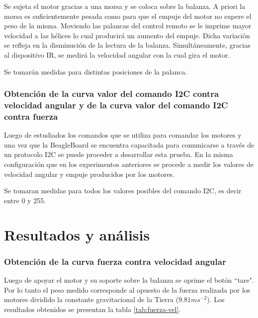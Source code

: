 \documentclass[spanish,12pt,a4paper,titlepage]{report}
\begin{document}
Se sujeta el motor gracias a una morsa y se coloca sobre la balanza. A priori la morsa es suficientemente pesada como para que el empuje del motor no supere el peso de la misma. Moviendo las palancas del control remoto se le imprime mayor velocidad a las hélices lo cual producirá un aumento del empuje. Dicha variación se refleja en la disminución de la lectura de la balanza. 
Simultáneamente, gracias al dispositivo IR, se medirá la velocidad angular con la cual gira el motor. 

Se tomarán medidas para distintas posiciones de la palanca.

\subsubsection*{Obtención de la curva valor del comando I2C contra velocidad angular y de la curva valor del comando I2C contra fuerza}

Luego de estudiados los comandos que se utiliza para comandar los motores y una vez que la BeagleBoard se encuentra capacitada para comunicarse a través de un protocolo I2C se puede proceder a desarrollar esta prueba. En la misma configuración que en los experimentos anteriores se procede a medir los valores de velocidad angular y empuje producidos por los motores. 

Se tomaran medidas para todos los valores posibles del comando I2C, es decir entre 0 y 255.

\section{Resultados y análisis}

\subsubsection{Obtención de la curva fuerza contra velocidad angular}

Luego de apoyar el motor y su soporte sobre la balanza se oprime el botón ``tare". Por lo tanto el peso medido corresponde al opuesto de la fuerza realizada por los motores dividido la constante gravitacional de la Tierra ($9.81ms^{-2}$). Los resultados obtenidos se presentan la tabla \ref{tab:fuerza-vel}.
\end{document}
